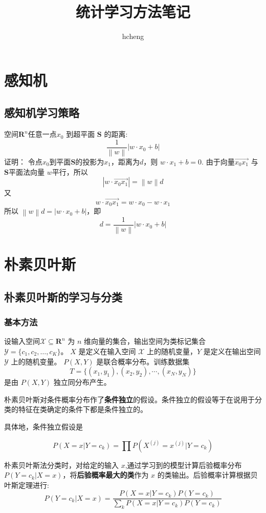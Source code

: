 \documentclass{ctexart}
\title{统计学习方法笔记}
\author{hcheng}
\begin{document}
\maketitle
\section{感知机}
\subsection{感知机学习策略}
空间$\mathbf{R}^n$任意一点$x_0$ 到超平面 $\mathbf{S} $ 的距离:
\[
    \frac{1}{\left\lVert {w} \right\rVert}\vert w \cdot x_0+ b \vert
\]
证明： 令点$x_0$到平面$\mathbf{S}$的投影为$x_1$，距离为$d$，则 $w \cdot x_1+b=0$.
由于向量$\overrightarrow{x_0x_1}$ 与$\mathbf{S}$平面法向量 $w$平行，所以
\[
    |w \cdot \overrightarrow{x_0x_1}| = \left\lVert {w}\right\rVert d
\]
又
\[
    w \cdot \overrightarrow{x_0x_1} = w \cdot x_0 - w \cdot x_1
\]
所以 $\left\lVert {w}\right\rVert d = |w \cdot x_0 + b|$，即
\[
    d = \frac{1}{\left\lVert {w}\right\rVert} \left\lvert {w \cdot x_0 + b}\right\rvert
\]
\section{朴素贝叶斯}
\subsection{朴素贝叶斯的学习与分类}
\subsubsection{基本方法}
设输入空间$\mathcal{X} \subseteq \mathbf{R}^{n}$ 为 $n$ 维向量的集合，输出空间为类标记集合 $\mathcal{Y} = \{ c_1,c_2,\ldots ,c_K \} $。
$X$ 是定义在输入空间 $\mathcal{X}$ 上的随机变量，$Y$ 是定义在输出空间 $\mathcal{Y}$ 上的随机变量。 $P (X,Y ) $ 是联合概率分布。训练数据集
\[
    T = \{ ( x_1,y_1) ,( x_2,y_2),\cdots , ( x_N, y_N) \}
\]
是由 $P (X,Y) $ 独立同分布产生。

朴素贝叶斯对条件概率分布作了\textbf{条件独立}的假设。条件独立的假设等于在说用于分类的特征在类确定的条件下都是条件独立的。

具体地，条件独立假设是

\[
    P (X = x | Y = c_k) = \prod{ P\left(X^{(j)} = x^{(j)} | Y = c_k\right)}
\]

朴素贝叶斯法分类时，对给定的输入 $x$,通过学习到的模型计算后验概率分布 $P ( Y = c_k | X = x ) $，将\textbf{后验概率最大的类}作为 $x$ 的类输出。后验概率计算根据贝叶斯定理进行:
\[
    P ( Y = c_k | X = x) = \frac{P(X=x|Y=c_k)P(Y=c_k)}{\sum_k{}P(X = x | Y = c_k) P(Y = c_k)}
\]
\end{document}
